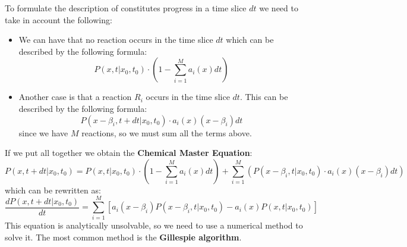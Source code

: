 To formulate the description of constitutes progress in a time slice $dt$ we need
to take in account the following:
\begin{itemize}
    \item We can have that no reaction occurs in the time slice $dt$ which can
          be described by the following formula:
          \begin{equation}
              P(x, t | x_0, t_0) \cdot \left(1 - \sum_{i=1}^M a_i(x)dt\right)
          \end{equation}
    \item Another case is that a reaction $R_i$ occurs in the time slice $dt$.
          This can be described by the following formula:
          \begin{equation}
              P(x - \beta_i, t + dt | x_0, t_0) \cdot a_i(x) (x - \beta_i)dt
          \end{equation}
          since we have $M$ reactions, so we must sum all the terms above.
\end{itemize}
If we put all together we obtain the \textbf{Chemical Master Equation}:
\begin{equation}
    P(x, t + dt|x_0, t_0) = P(x, t | x_0, t_0) \cdot \left(1 - \sum_{i=1}^M a_i(x)dt\right)
    + \sum_{i=1}^M (P(x - \beta_i, t | x_0, t_0) \cdot a_i(x) (x - \beta_i)dt)
\end{equation}
which can be rewritten as:
\begin{equation}
    \frac{dP(x, t + dt|x_0, t_0)}{dt} = \sum_{i=1}^M \left[ a_i(x - \beta_i)P(x -
        \beta_i, t|x_0, t_0) - a_i(x)P(x, t|x_0, t_0) \right]
\end{equation}
This equation is analytically unsolvable, so we need to use a numerical method
to solve it. The most common method is the \textbf{Gillespie algorithm}.